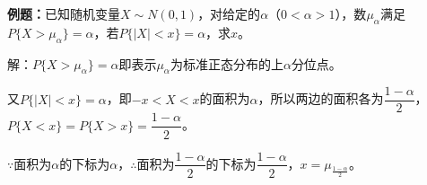 \documentclass[UTF8, 12pt]{ctexart}
\begin{document}
\textbf{例题：}已知随机变量$X\sim N(0,1)$，对给定的$\alpha$（$0<\alpha>1$），数$\mu_\alpha$满足$P\{X>\mu_\alpha\}=\alpha$，若$P\{\vert X\vert<x\}=\alpha$，求$x$。

解：$P\{X>\mu_\alpha\}=\alpha$即表示$\mu_\alpha$为标准正态分布的上$\alpha$分位点。

又$P\{\vert X\vert<x\}=\alpha$，即$-x<X<x$的面积为$\alpha$，所以两边的面积各为$\dfrac{1-\alpha}{2}$，$P\{X<x\}=P\{X>x\}=\dfrac{1-\alpha}{2}$。

$\because$面积为$\alpha$的下标为$\alpha$，$\therefore$面积为$\dfrac{1-\alpha}{2}$的下标为$\dfrac{1-\alpha}{2}$，$x=\mu_\frac{1-\alpha}{2}$。
\end{document}

